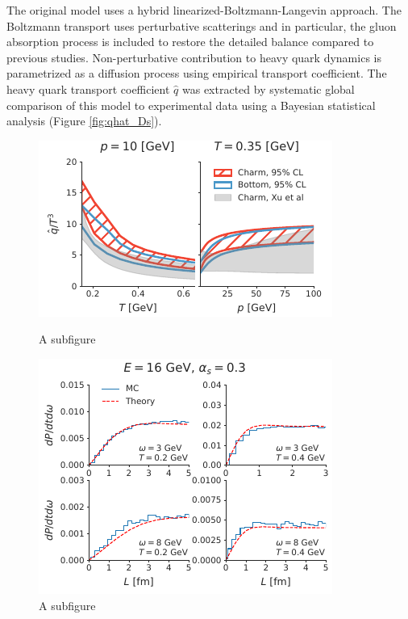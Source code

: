 \documentclass[12pt,a4paper]{article}
\begin{document}
The original model uses a hybrid linearized-Boltzmann-Langevin approach. The Boltzmann transport uses perturbative scatterings and in particular, the gluon absorption process is included to restore the detailed balance compared to previous studies. 
Non-perturbative contribution to heavy quark dynamics is parametrized as a diffusion process using empirical transport coefficient.
The heavy quark transport coefficient $\hat{q}$ was extracted by systematic global comparison of this model to experimental data using a Bayesian statistical analysis (Figure \ref{fig:qhat_Ds}).
\begin{figure}[ht]
\centering
\begin{minipage}{.51\textwidth}
  \centering
  \includegraphics[width=\linewidth]{qhat_p_T.pdf}
  \caption{A subfigure}\label{fig:qhat_Ds}
\end{minipage}
\begin{minipage}{.48\textwidth}
  \centering
  \includegraphics[width=\linewidth]{spectrum_L.pdf}
  \caption{A subfigure}\label{fig:spectra}
\end{minipage}
\end{figure}
\end{document}
